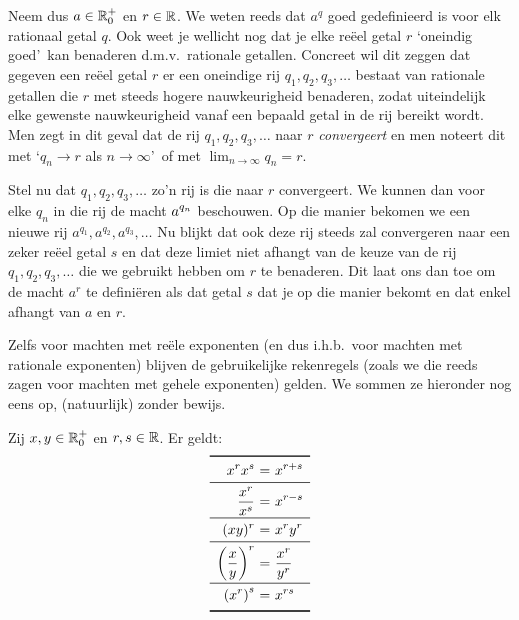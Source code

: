 \documentclass{ximera}
\begin{document}
Neem dus $a\in\mathbb{R}_0^+$ en $r\in\mathbb{R}$. We weten reeds dat $a^q$
goed gedefinieerd is voor elk rationaal getal $q$. Ook weet je
wellicht nog dat je elke re\"eel getal $r$ \lq oneindig goed\rq\
kan benaderen d.m.v.~rationale getallen. Concreet wil dit zeggen
dat gegeven een re\"eel getal $r$ er een oneindige rij
$q_1,q_2,q_3,\ldots$ bestaat van rationale getallen die $r$ met
steeds hogere nauwkeurigheid benaderen, zodat uiteindelijk elke
gewenste nauwkeurigheid vanaf een bepaald getal in de rij bereikt
wordt. Men zegt in dit geval dat de rij $q_1,q_2,q_3,\ldots$ naar
$r$ \emph{convergeert} en men noteert dit met \lq $q_n\to r$ als
$n\to\infty$\rq\ of met $\lim_{n\to\infty}q_n=r$.

Stel nu dat $q_1,q_2,q_3,\ldots$ zo'n rij is die naar $r$
convergeert. We kunnen dan voor elke $q_n$ in die rij de macht
$\displaystyle a^{q_n}$ beschouwen. Op die manier bekomen we een nieuwe rij
$a^{q_1},a^{q_2},a^{q_3},\ldots$ Nu blijkt dat ook deze rij steeds
zal convergeren naar een zeker re\"eel getal $s$ en dat deze
limiet niet afhangt van de keuze van de rij $q_1,q_2,q_3,\ldots$
die we gebruikt hebben om $r$ te benaderen. Dit laat ons dan toe
om de macht $a^r$ te defini\"eren als dat getal $s$ dat je op die
manier bekomt en dat enkel afhangt van $a$ en $r$.

Zelfs voor machten met re\"ele exponenten (en dus i.h.b.~voor
machten met rationale exponenten) blijven de gebruikelijke
rekenregels (zoals we die reeds zagen voor machten met gehele
exponenten) gelden. We sommen ze hieronder nog eens op,
(natuurlijk) zonder bewijs.
\begin{proposition}
	Zij $x,y\in\mathbb{R}_0^+$ en $r,s\in\mathbb{R}$. Er geldt:
	\[
	\begin{array}{r@{\ =\ }l}
	\specialrule{.1em}{0ex}{1ex}
	\ds{x^{r}x^{s}}&\ds{x^{r+s}}\\
	\midrule
	\ds{\frac{x^{r}}{x^{s}}}&\ds{x^{r-s}}\\
	\midrule
	\ds{(xy)^r}&\ds{x^ry^r}\\
	\midrule
	\ds{\left(\frac{x}{y}\right)^{r}}&\ds{\frac{x^{r}}{y^{r}}}\\
	\midrule
	\ds{\left(x^{r}\right)^{s}}&\ds{x^{rs}}\\
	\specialrule{.1em}{1ex}{0ex}
	\end{array}
	\]
\end{proposition}
\end{document}
